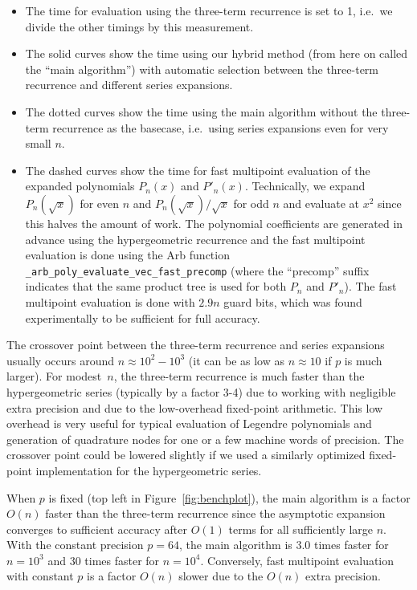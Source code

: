 \documentclass[11pt,a4paper]{article}
\begin{document}
\begin{itemize}
\item The time for evaluation using the three-term recurrence is set to 1, i.e.\ we divide
the other timings by this measurement.
\item The solid curves show the time using our hybrid method
(from here on called the ``main algorithm'')
with automatic selection between the three-term
recurrence and different
series expansions.
\item The dotted curves show the time using the main algorithm without
the three-term recurrence as the basecase, i.e.\ using series expansions
even for very small $n$.
\item The dashed curves show the time for fast multipoint
evaluation of the expanded polynomials $P_n(x)$ and $P'_n(x)$.
Technically, we expand
$P_{n}(\sqrt{x})$ for even $n$ and $P_{n}(\sqrt{x})/\sqrt{x}$ for odd $n$
and evaluate at $x^2$ since this halves the amount of work.
The polynomial coefficients are generated in advance using
the hypergeometric recurrence and
the fast multipoint evaluation is done using
the Arb function \texttt{\_arb\_poly\_evaluate\_vec\_fast\_precomp}
(where the ``precomp'' suffix indicates that
the same product tree is used for both $P_n$ and $P'_n$).
The fast multipoint evaluation is done with $2.9n$ guard bits,
which was found experimentally to be sufficient for full accuracy.
\end{itemize}

The crossover point between the
three-term recurrence and series expansions usually occurs
around $n \approx 10^2 - 10^3$ (it can be as low as $n \approx 10$
if $p$ is much larger).
For modest $n$,
the three-term recurrence is much faster
than the hypergeometric series (typically by a factor 3-4)
due to working with negligible extra precision
and due to the low-overhead fixed-point arithmetic.
This low overhead is very useful for typical evaluation of
Legendre polynomials and generation of quadrature nodes
for one or a few machine words of precision.
The crossover point could be lowered slightly
if we used a similarly optimized fixed-point implementation
for the hypergeometric series.

When $p$ is fixed (top left in Figure~\ref{fig:benchplot}), the main algorithm is
a factor $O(n)$ faster
than the three-term recurrence
since the asymptotic expansion converges to sufficient accuracy after
$O(1)$ terms for all sufficiently large $n$.
With the constant precision $p = 64$,
the main algorithm is 3.0
times faster for $n = 10^3$ and 30 times faster for $n = 10^4$.
Conversely, fast multipoint evaluation
with constant $p$ is a factor $O(n)$ slower due to the $O(n)$ extra precision.
\end{document}
